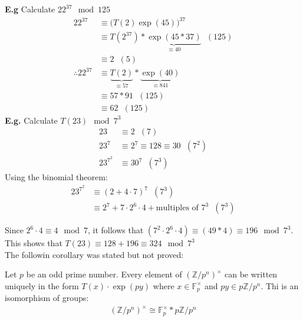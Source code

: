 \documentclass[11pt]{article}
\begin{document}
\textbf{E.g} Calculate $22^{37} \mod 125$
\begin{align*}
	22^{37} &\equiv \big(T(2)\exp(45) \big)^{37}\\
	&\equiv T(2^{37})* \underbrace{\exp(45*37)}_\text{$\equiv 40$} \hspace{7pt} (125)\\
	&\equiv 2 \hspace{7pt}(5)\\[1em]
	\therefore 22^{37} &\equiv \underbrace{T(2)}_\text{$\equiv 57$} * \underbrace{\exp(40)}_\text{$\equiv 841$}\\
	&\equiv 57*91 \hspace{7pt} (125)\\
	&\equiv 62 \hspace{7pt} (125) 
\end{align*}
\newpage
\textbf{E.g.} Calculate $T(23) \mod 7^3$
\begin{align*}
	23 &\equiv 2 \hspace{7pt} (7) \\
	23^7 &\equiv 2^7 \equiv 128 \equiv 30 \hspace{7pt} (7^2)\\
	23^{7^2} &\equiv 30^7 \hspace{7pt} (7^3)
\end{align*}
Using the binomial theorem: 
	\begin{align*}
		23^{7^2} &\equiv (2+ 4\cdot7 )^7\hspace{7pt} (7^3)\\
		&\equiv 2^7 + 7\cdot 2^6 \cdot 4 + \text{multiples of $7^3$} \hspace{7pt} (7^3)
	\end{align*}
	
	Since $2^6 \cdot 4 \equiv 4 \mod 7 $, it follows that $(7^2 \cdot 2^6 \cdot 4) \equiv (49* 4) \equiv 196 \mod 7^3 $. This shows that $T(23) \equiv 128 + 196 \equiv 324 \mod 7^3$\\[1em]


	The followin corollary was stated but not proved:
\begin{corollary}
	Let $p$ be an odd prime number. Every element of $(\mathbb{Z}/p^n)^\times$ can be written uniquely in the form $T(x) \cdot \exp(py)$ where $x \in \mathbb{F}_p^{\times} $ and $py \in p\mathbb{Z}/p^n$. Thi is an isomorphism of groups:
	\begin{align*}
		(\mathbb{Z}/p^n)^\times \cong \mathbb{F}_p^\times * p\mathbb{Z}/p^n
	\end{align*}
\end{corollary}
\end{document}
